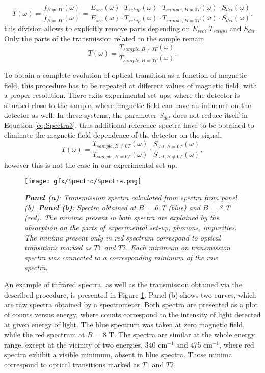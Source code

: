 \documentclass[titlepage,a4paper]{book}
\begin{document}
\begin{equation}
\label{eq:Spectra3}
T(\omega) = \frac{f_{B\neq 0T}(\omega)}{f_{B=0T}(\omega)} = \frac{E_{src}(\omega)\cdot T_{setup}(\omega)\cdot T_{sample,B\neq 0T}(\omega)\cdot S_{det}(\omega)}{E_{src}(\omega)\cdot T_{setup}(\omega)\cdot T_{sample,B=0T}(\omega)\cdot S_{det}(\omega)}.
\end{equation}
this division allows to explicitly remove parts depending on $E_{src}$, $T_{setup}$, and $S_{det}$. Only the parts of the transmission related to the sample remain
\begin{equation}
\label{eq:Spectra4}
T(\omega) = \frac{T_{sample,B\neq 0T}(\omega)}{ T_{sample,B=0T}(\omega)}.
\end{equation}

To obtain a complete evolution of optical transition as a function of magnetic field, this procedure has to be repeated at different values of magnetic field, with a proper resolution. There exits experimental set-ups, where the detector is situated close to the sample, where magnetic field can have an influence on the detector as well. In these systems, the parameter $S_{det}$ does not reduce itself in Equation \ref{eq:Spectra3}, thus additional reference spectra have to be obtained to eliminate the magnetic field dependence of the detector on the signal.
\begin{equation}
\label{eq:Spectra5}
T(\omega) = \frac{T_{sample,B\neq 0T}(\omega)}{ T_{sample,B=0T}(\omega)}\cdot \frac{S_{det,B = 0T}(\omega)}{ S_{det,B\neq 0T}(\omega)},
\end{equation}
however this is not the case in our experimental set-up.

\begin{figure}[ht]
	\centering
	\texttt{[image: gfx/Spectro/Spectra.png]}
	\vspace{-10pt}
	\caption{\textit{\textbf{Panel (a)}: Transmission spectra calculated from spectra from panel (b). \textbf{Panel (b)}: Spectra obtained at $B$ = 0 T (blue) and $B$ = 8 T (red). The minima present in both spectra are explained by the absorption on the parts of experimental set-up, phonons, impurities. The minima present only in red spectrum correspond to optical transitions marked as $T1$ and $T2$. Each minimum on transmission spectra was connected to a corresponding minimum of the raw spectra.}}
	\label{fig:Spectra}
\end{figure}
An example of infrared spectra, as well as the transmission obtained via the described procedure, is presented in Figure \ref{fig:Spectra}. Panel (b) shows two curves, which are raw spectra obtained by a spectrometer. Both spectra are presented as a plot of counts versus energy, where counts correspond to the intensity of light detected at given energy of light. The blue spectrum was taken at zero magnetic field, while the red spectrum at $B$ = 8 T. The spectra are similar at the whole energy range, except at the vicinity of two energies, 340 cm$^{-1}$ and 475 cm$^{-1}$, where red spectra exhibit a visible minimum, absent in blue spectra. Those minima correspond to optical transitions marked as $T1$ and $T2$. 
\end{document}
